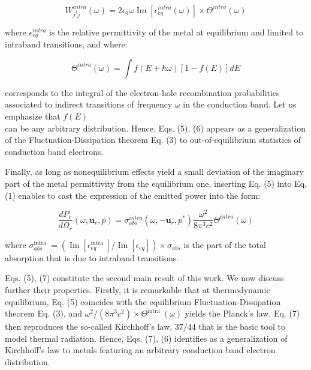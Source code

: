 \documentclass[10pt]{article}
\begin{document}
\begin{equation*}
W_{j^{\dagger} j}^{i n t r a}(\omega)=2 \epsilon_{0} \omega \operatorname{Im}\left[\epsilon_{e q}^{i n t r a}(\omega)\right] \times \Theta^{i n t r a}(\omega) \tag{5}
\end{equation*}


where $\epsilon_{e q}^{i n t r a}$ is the relative permittivity of the metal at equilibrium and limited to intraband transitions, and where:


\begin{equation*}
\Theta^{i n t r a}(\omega)=\int f(E+\hbar \omega)[1-f(E)] d E \tag{6}
\end{equation*}


corresponds to the integral of the electron-hole recombination probabilities associated to indirect transitions of frequency $\omega$ in the conduction band. Let us emphasize that $f(E)$\\
can be any arbitrary distribution. Hence, Eqs. (5), (6) appears as a generalization of the Fluctuation-Dissipation theorem Eq. (3) to out-of-equilibrium statistics of conduction band electrons.

Finally, as long as nonequilibrium effects yield a small deviation of the imaginary part of the metal permittivity from the equilibrium one, inserting Eq. (5) into Eq. (1) enables to cast the expression of the emitted power into the form:


\begin{equation*}
\frac{d P_{e}}{d \Omega_{r}}\left(\omega, \boldsymbol{u}_{r}, p\right)=\sigma_{a b s}^{i n t r a}\left(\omega,-\boldsymbol{u}_{r}, p^{*}\right) \frac{\omega^{2}}{8 \pi^{3} c^{2}} \Theta^{i n t r a}(\omega) \tag{7}
\end{equation*}


where $\sigma_{a b s}^{\text {intra }}=\left(\operatorname{Im}\left[\epsilon_{e q}^{\text {intra }}\right] / \operatorname{Im}\left[\epsilon_{e q}\right]\right) \times \sigma_{a b s}$ is the part of the total absorption that is due to intraband transitions.

Eqs. (5), (7) constitute the second main result of this work. We now discuss further their properties. Firstly, it is remarkable that at thermodynamic equilibrium, Eq. (5) coincides with the equilibrium Fluctuation-Dissipation theorem Eq. (3), and $\omega^{2} /\left(8 \pi^{3} c^{2}\right) \times \Theta^{\text {intra }}(\omega)$ yields the Planck's law. Eq. (7) then reproduces the so-called Kirchhoff's law, $37 / 44$ that is the basic tool to model thermal radiation. Hence, Eqs. (7), (6) identifies as a generalization of Kirchhoff's law to metals featuring an arbitrary conduction band electron distribution.
\end{document}
